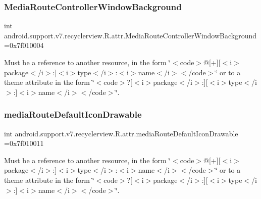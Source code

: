 \subsubsection{\texorpdfstring{Media\+Route\+Controller\+Window\+Background}{MediaRouteControllerWindowBackground}}
{\footnotesize\ttfamily int android.\+support.\+v7.\+recyclerview.\+R.\+attr.\+Media\+Route\+Controller\+Window\+Background =0x7f010004\hspace{0.3cm}{\ttfamily [static]}}

Must be a reference to another resource, in the form \char`\"{}$<$code$>$@\mbox{[}+\mbox{]}\mbox{[}$<$i$>$package$<$/i$>$\+:\mbox{]}$<$i$>$type$<$/i$>$\+:$<$i$>$name$<$/i$>$$<$/code$>$\char`\"{} or to a theme attribute in the form \char`\"{}$<$code$>$?\mbox{[}$<$i$>$package$<$/i$>$\+:\mbox{]}\mbox{[}$<$i$>$type$<$/i$>$\+:\mbox{]}$<$i$>$name$<$/i$>$$<$/code$>$\char`\"{}. \mbox{\label{classandroid_1_1support_1_1v7_1_1recyclerview_1_1R_1_1attr_a1bb47e107417606d7a798a3dbc4be71a}} 
\subsubsection{\texorpdfstring{media\+Route\+Default\+Icon\+Drawable}{mediaRouteDefaultIconDrawable}}
{\footnotesize\ttfamily int android.\+support.\+v7.\+recyclerview.\+R.\+attr.\+media\+Route\+Default\+Icon\+Drawable =0x7f010011\hspace{0.3cm}{\ttfamily [static]}}

Must be a reference to another resource, in the form \char`\"{}$<$code$>$@\mbox{[}+\mbox{]}\mbox{[}$<$i$>$package$<$/i$>$\+:\mbox{]}$<$i$>$type$<$/i$>$\+:$<$i$>$name$<$/i$>$$<$/code$>$\char`\"{} or to a theme attribute in the form \char`\"{}$<$code$>$?\mbox{[}$<$i$>$package$<$/i$>$\+:\mbox{]}\mbox{[}$<$i$>$type$<$/i$>$\+:\mbox{]}$<$i$>$name$<$/i$>$$<$/code$>$\char`\"{}. \mbox{\label{classandroid_1_1support_1_1v7_1_1recyclerview_1_1R_1_1attr_a02776330404d711cd17a612f4f21cef1}} 
